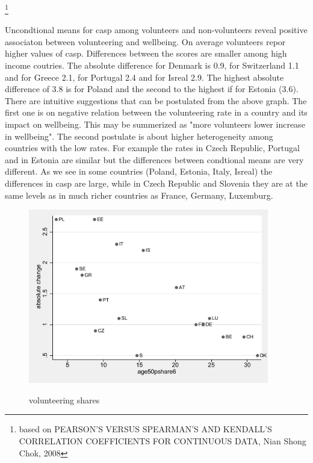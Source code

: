 \documentclass[10pt, letterpaper]{article}
\begin{document}
\begin{spacing}{1.4}
\footnote{based on PEARSON'S VERSUS SPEARMAN'S AND KENDALL'S CORRELATION COEFFICIENTS FOR CONTINUOUS DATA, Nian Shong Chok, 2008}



Uncondtional means for casp among volunteers and non-volunteers reveal positive associaton between volunteering and wellbeing.  On average volunteers repor higher values of casp. Differences between the scores are smaller among  high income coutries. The absolute difference for Denmark  is 0.9, for Switzerland 1.1 and for Greece 2.1, for Portugal 2.4 and for Isreal 2.9. The highest absolute difference of 3.8 is for Poland and the second to the highest if for Estonia (3.6). There are intuitive suggestions that can be postulated from the above graph. The first one is on negative relation between the volunteering rate in a country and its impact on wellbeing. This may be summerized as "more volunteers lower increase in wellbeing". The second postulate is about higher heterogeneity among countries with the low rates. For example the rates in Czech Republic, Portugal and in Estonia are similar but the differences between condtional means are very different. As we see in some countries (Poland, Estonia, Italy, Isreal) the differences in casp are large, while in Czech Republic and Slovenia they are at the same levels as in much richer countries as France, Germany, Luxemburg.     


\begin{figure}[H]
 \includegraphics[height=3in]{abs_casp.pdf}
 \centering
 \label{fig:oecd_50p}
\caption{volunteering shares}
\end{figure}



\end{spacing}
\end{document}
